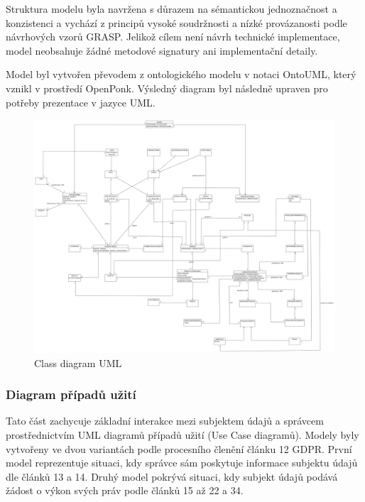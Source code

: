 Struktura modelu byla navržena s důrazem na sémantickou jednoznačnost a konzistenci a vychází z principů vysoké soudržnosti a nízké provázanosti podle návrhových vzorů GRASP. Jelikož cílem není návrh technické implementace, model neobsahuje žádné metodové signatury ani implementační detaily.

Model byl vytvořen převodem z ontologického modelu v notaci OntoUML, který vznikl v prostředí OpenPonk. Výsledný diagram byl následně upraven pro potřeby prezentace v jazyce UML. 

\begin{figure}[H]
  \centering
  \includegraphics[width=\textwidth]{images/UML_class.png}
  \caption{Class diagram UML}
  \label{fig:uml_class}
\end{figure}


\subsubsection{Diagram případů užití}
\label{sec:uml-diagram-pripadu-uziti}
Tato část zachycuje základní interakce mezi subjektem údajů a správcem prostřednictvím UML diagramů případů užití (Use Case diagramů). Modely byly vytvořeny ve dvou variantách podle procesního členění článku 12 GDPR. První model reprezentuje situaci, kdy správce sám poskytuje informace subjektu údajů dle článků 13 a 14. Druhý model pokrývá situaci, kdy subjekt údajů podává žádost o výkon svých práv podle článků 15 až 22 a 34.

